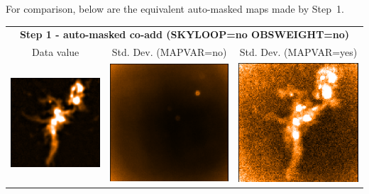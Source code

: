 \vspace{5mm}

For comparison, below are the equivalent auto-masked maps made by Step~1.

\vspace{5mm}
\begin{tabular}{|ccc|}
\hline
\multicolumn{3}{|c|}{\textbf{Step 1 - auto-masked co-add (SKYLOOP=no OBSWEIGHT=no)}} \\
Data value & Std. Dev. (MAPVAR=no) & Std. Dev. (MAPVAR=yes) \\
\includegraphics[width=\picwid]{tailoring/i5.png} &
\includegraphics[width=\picwid]{tailoring/sqvar5.png} &
\includegraphics[width=\picwid]{tailoring/disp5.png} \\
\hline
\end{tabular}


